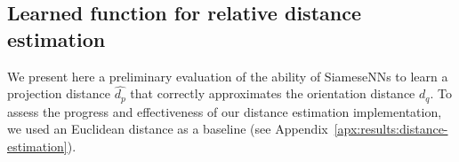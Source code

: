 
\subsection{Learned function for relative distance estimation }\label{sec:results:distance-estimation:learned}


We present here a preliminary evaluation of the ability of SiameseNNs to learn a projection distance $\widehat{d_p}$ that correctly approximates the orientation distance $d_q$. 
To assess the progress and effectiveness of our distance estimation implementation, we used an Euclidean distance as a baseline (see Appendix~\ref{apx:results:distance-estimation}).


